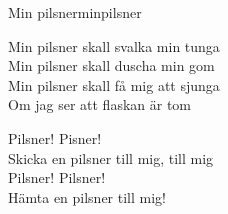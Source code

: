 \begin{song}{Min pilsner}{minpilsner}
\begin{vers}
Min pilsner skall svalka min tunga\\
Min pilsner skall duscha min gom\\
Min pilsner skall få mig att sjunga\\
Om jag ser att flaskan är tom\\
\end{vers}
\begin{vers}
Pilsner! Pisner!\\
Skicka en pilsner till mig, till mig\\
Pilsner! Pilsner!\\
Hämta en pilsner till mig!\\
\end{vers}
\end{song}
